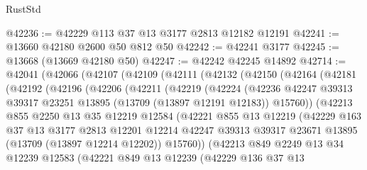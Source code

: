 \begin{lexlean}{RustStd}
\begin{coremodule}
@42236 := @42229 @113 @37 @13 @3177 @2813 @12182 @12191
@42241 := @13660 @42180 @2600 @50 @812 @50
@42242 := @42241 @3177
@42245 := @13668 (@13669 @42180 @50)
@42247 := @42242 @42245 @14892
@42714 := @42041
    (@42066
      (@42107
        (@42109
          (@42111
            (@42132
              (@42150
                (@42164
                  (@42181
                    (@42192
                      (@42196
                        (@42206
                          (@42211
                            (@42219
                              (@42224
                                (@42236
                                  @42247
                                  @39313
                                  @39317
                                  @23251
                                  @13895
                                  (@13709 (@13897 @12191 @12183))
                                  @15760))
                              (@42213
                                @855
                                @2250
                                @13
                                @35
                                @12219
                                @12584
                                (@42221
                                  @855
                                  @13
                                  @12219
                                  (@42229
                                    @163
                                    @37
                                    @13
                                    @3177
                                    @2813
                                    @12201
                                    @12214
                                    @42247
                                    @39313
                                    @39317
                                    @23671
                                    @13895
                                    (@13709 (@13897 @12214 @12202))
                                    @15760))
                                (@42213
                                  @849
                                  @2249
                                  @13
                                  @34
                                  @12239
                                  @12583
                                  (@42221
                                    @849
                                    @13
                                    @12239
                                    (@42229
                                      @136
                                      @37
                                      @13

\end{coremodule}
\end{lexlean}
